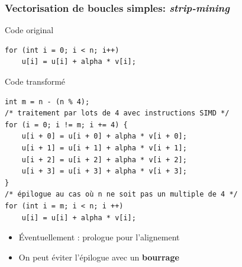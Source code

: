 \documentclass[xcolor={x11names,svgnames}]{beamer}
\begin{document}

\begin{frame}[fragile=singleslide]
  \frametitle{Vectorisation de boucles simples: \textit{strip-mining}}

  \begin{block}{Code original}
  \begin{verbatim}
for (int i = 0; i < n; i++)
    u[i] = u[i] + alpha * v[i];
\end{verbatim}
\end{block}

\begin{exampleblock}{Code transformé}
\begin{verbatim}
int m = n - (n % 4);
/* traitement par lots de 4 avec instructions SIMD */
for (i = 0; i != m; i += 4) {
    u[i + 0] = u[i + 0] + alpha * v[i + 0];
    u[i + 1] = u[i + 1] + alpha * v[i + 1];
    u[i + 2] = u[i + 2] + alpha * v[i + 2];
    u[i + 3] = u[i + 3] + alpha * v[i + 3];
}
/* épilogue au cas où n ne soit pas un multiple de 4 */
for (int i = m; i < n; i ++)
    u[i] = u[i] + alpha * v[i];
  \end{verbatim}
\end{exampleblock}
\begin{itemize}
\item Éventuellement : prologue pour l'alignement
\item On peut éviter l'épilogue avec un \textbf{bourrage}
\end{itemize}
\end{frame}

\end{document}
